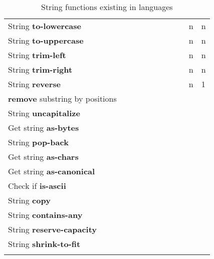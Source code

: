 \documentclass[anonymous,sigplan,review,11pt,nonacm,natbib=false]{acmart}
\begin{document}
\begin{longtable}{lllllllllll}
        String \textbf{to-lowercase} &  &  &  &  &  & &  &  & n & n \\

        String \textbf{to-uppercase} &  &  &  &  &  & &  &  & n & n \\

        String \textbf{trim-left} &  &  &  &  &  &  &  &  & n & n \\

        String \textbf{trim-right} &  &  &  &  &  & &  &  & n & n \\

        String \textbf{reverse} &  &  &  &  &  & &  &  & n & 1 \\

        \textbf{remove} substring by positions &  &  &  &  &  & &  &  &  & \\

        String \textbf{uncapitalize} &  &  &  &  &  & &  &  &  & \\

        Get string \textbf{as-bytes} &  &  &  &  &  & &  &  &  & \\

        String \textbf{pop-back} &  &  &  &  &  & &  &  &  & \\

        Get string \textbf{as-chars} &  &  &  &  &  & &  &  &  & \\

        Get string \textbf{as-canonical} &  &  &  &  &  & &  &  &  & \\

        Check if \textbf{is-ascii}  &  &  &  &  &  & &  &  &  & \\

        String \textbf{copy} &  &  &  &  &  & &  &  &  & \\

        String \textbf{contains-any} &  &  &  &  &  & &  &  &  & \\

        String \textbf{reserve-capacity} &  &  &  &  &  & &  &  &  & \\

        String \textbf{shrink-to-fit} &  &  &  &  &  & &  &  &  & \\ \hline
        \caption{String functions existing in languages}
        \label{tab:my_label}
    \end{longtable}

    \printbibliography
\end{document}
